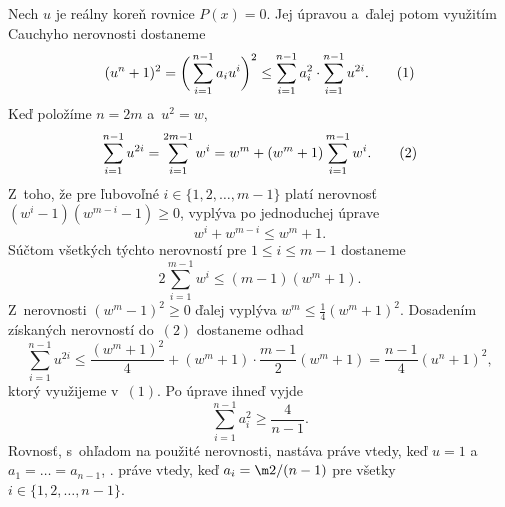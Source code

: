 {%
Nech $u$ je reálny koreň rovnice $P(x)=0$. Jej úpravou a~ďalej
potom využitím Cauchyho nerovnosti dostaneme
$$
(u^n+1)^2=\bigg(\sum_{i=1}^{n-1} a_iu^i\bigg)^2\leq
              \sum_{i=1}^{n-1} a_i^2\cdot \sum_{i=1}^{n-1} u^{2i}. \tag1
$$
Keď položíme $n=2m$ a~$u^2=w$,
$$
\sum_{i=1}^{n-1} u^{2i}=\sum_{i=1}^{2m-1} w^i=
                            w^m+(w^m+1)\sum_{i=1}^{m-1} w^i. \tag2
$$
Z~toho, že pre ľubovoľné $i\in \{1,2,\dots ,m-1\}$
platí nerovnosť $(w^i-1)(w^{m-i}-1)\geq 0$, vyplýva po jednoduchej
úprave
$$
w^i+w^{m-i}\leq w^m+1.
$$
Súčtom všetkých týchto nerovností pre $1\leq i\leq m-1$ dostaneme
$$
2\sum_{i=1}^{m-1} w^i\leq (m-1)(w^m+1).
$$
Z~nerovnosti $(w^m-1)^2\geq 0$ ďalej vyplýva
$w^m\leq\frac14(w^m+1)^2$. Dosadením získaných nerovností
do~$(2)$ dostaneme odhad
$$
\sum_{i=1}^{n-1} u^{2i}\leq \frac{(w^m+1)^2}4+
      (w^m+1)\cdot \frac{m-1}2(w^m+1)=\frac{n-1}4(u^n+1)^2,
$$
ktorý využijeme v~$(1)$. Po úprave ihneď vyjde
$$
\sum_{i=1}^{n-1} a_i^2\geq \frac{4}{n-1}.
$$
Rovnosť, s~ohľadom na použité nerovnosti, nastáva práve vtedy, keď
$u=1$ a~$a_1=\dots=a_{n-1}$, \tj. práve vtedy, keď $a_i=\m2/(n-1)$
pre všetky $i\in \{1,2,\dots ,{n-1}\}$.}


